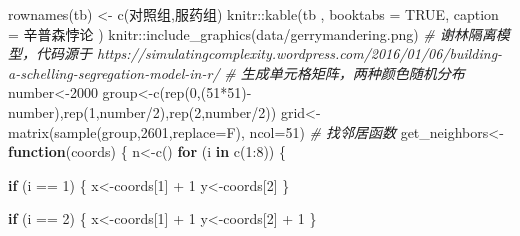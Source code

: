 \documentclass[]{tufte-book}
\newenvironment{Shaded}{}{}
\newcommand{\AttributeTok}[1]{\textcolor[rgb]{0.49,0.56,0.16}{#1}}
\newcommand{\CommentTok}[1]{\textcolor[rgb]{0.38,0.63,0.69}{\textit{#1}}}
\newcommand{\ConstantTok}[1]{\textcolor[rgb]{0.53,0.00,0.00}{#1}}
\newcommand{\ControlFlowTok}[1]{\textcolor[rgb]{0.00,0.44,0.13}{\textbf{#1}}}
\newcommand{\DecValTok}[1]{\textcolor[rgb]{0.25,0.63,0.44}{#1}}
\newcommand{\FunctionTok}[1]{\textcolor[rgb]{0.02,0.16,0.49}{#1}}
\newcommand{\NormalTok}[1]{#1}
\newcommand{\OtherTok}[1]{\textcolor[rgb]{0.00,0.44,0.13}{#1}}
\newcommand{\SpecialCharTok}[1]{\textcolor[rgb]{0.25,0.44,0.63}{#1}}
\newcommand{\StringTok}[1]{\textcolor[rgb]{0.25,0.44,0.63}{#1}}
\begin{document}
\begin{Shaded}
\begin{Highlighting}[]
\FunctionTok{rownames}\NormalTok{(tb) }\OtherTok{\textless{}{-}} \FunctionTok{c}\NormalTok{(}\StringTok{\textquotesingle{}对照组\textquotesingle{}}\NormalTok{,}\StringTok{\textquotesingle{}服药组\textquotesingle{}}\NormalTok{)}
\NormalTok{knitr}\SpecialCharTok{::}\FunctionTok{kable}\NormalTok{(tb}
\NormalTok{             , }\AttributeTok{booktabs =} \ConstantTok{TRUE}\NormalTok{,}
             \AttributeTok{caption =} \StringTok{\textquotesingle{}辛普森悖论\textquotesingle{}}
\NormalTok{)}
\NormalTok{knitr}\SpecialCharTok{::}\FunctionTok{include\_graphics}\NormalTok{(}\StringTok{\textquotesingle{}data/gerrymandering.png\textquotesingle{}}\NormalTok{)}
\CommentTok{\# 谢林隔离模型，代码源于 https://simulatingcomplexity.wordpress.com/2016/01/06/building{-}a{-}schelling{-}segregation{-}model{-}in{-}r/}
\CommentTok{\# 生成单元格矩阵，两种颜色随机分布}
\NormalTok{number}\OtherTok{\textless{}{-}}\DecValTok{2000}
\NormalTok{group}\OtherTok{\textless{}{-}}\FunctionTok{c}\NormalTok{(}\FunctionTok{rep}\NormalTok{(}\DecValTok{0}\NormalTok{,(}\DecValTok{51}\SpecialCharTok{*}\DecValTok{51}\NormalTok{)}\SpecialCharTok{{-}}\NormalTok{number),}\FunctionTok{rep}\NormalTok{(}\DecValTok{1}\NormalTok{,number}\SpecialCharTok{/}\DecValTok{2}\NormalTok{),}\FunctionTok{rep}\NormalTok{(}\DecValTok{2}\NormalTok{,number}\SpecialCharTok{/}\DecValTok{2}\NormalTok{))}
\NormalTok{grid}\OtherTok{\textless{}{-}}\FunctionTok{matrix}\NormalTok{(}\FunctionTok{sample}\NormalTok{(group,}\DecValTok{2601}\NormalTok{,}\AttributeTok{replace=}\NormalTok{F), }\AttributeTok{ncol=}\DecValTok{51}\NormalTok{)}
\CommentTok{\# 找邻居函数}
\NormalTok{get\_neighbors}\OtherTok{\textless{}{-}}\ControlFlowTok{function}\NormalTok{(coords) \{}
\NormalTok{        n}\OtherTok{\textless{}{-}}\FunctionTok{c}\NormalTok{()}
        \ControlFlowTok{for}\NormalTok{ (i }\ControlFlowTok{in} \FunctionTok{c}\NormalTok{(}\DecValTok{1}\SpecialCharTok{:}\DecValTok{8}\NormalTok{)) \{}
                
                \ControlFlowTok{if}\NormalTok{ (i }\SpecialCharTok{==} \DecValTok{1}\NormalTok{) \{}
\NormalTok{                        x}\OtherTok{\textless{}{-}}\NormalTok{coords[}\DecValTok{1}\NormalTok{] }\SpecialCharTok{+} \DecValTok{1}
\NormalTok{                        y}\OtherTok{\textless{}{-}}\NormalTok{coords[}\DecValTok{2}\NormalTok{]}
\NormalTok{                \}}
                
                \ControlFlowTok{if}\NormalTok{ (i }\SpecialCharTok{==} \DecValTok{2}\NormalTok{) \{}
\NormalTok{                        x}\OtherTok{\textless{}{-}}\NormalTok{coords[}\DecValTok{1}\NormalTok{] }\SpecialCharTok{+} \DecValTok{1}
\NormalTok{                        y}\OtherTok{\textless{}{-}}\NormalTok{coords[}\DecValTok{2}\NormalTok{] }\SpecialCharTok{+} \DecValTok{1}
\NormalTok{                \}}
                

\end{Highlighting}
\end{Shaded}
\end{document}
